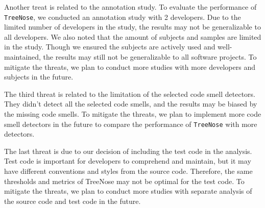 Another treat is related to the annotation study. To evaluate the performance
of \texttt{TreeNose}, we conducted an annotation study with 2 developers. Due
to the limited number of developers in the study, the results may not be
generalizable to all developers. We also noted that the amount of subjects and
samples are limited in the study. Though we ensured the subjects are actively
used and well-maintained, the results may still not be generalizable to all
software projects. To mitigate the threats, we plan to conduct more studies
with more developers and subjects in the future.

The third threat is related to the limitation of the selected code smell
detectors. They didn't detect all the selected code smells, and the results may
be biased by the missing code smells. To mitigate the threats, we plan to
implement more code smell detectors in the future to compare the performance of
\texttt{TreeNose} with more detectors.

The last threat is due to our decision of including the test code in the
analysis. Test code is important for developers to comprehend and maintain, but
it may have different conventions and styles from the source code. Therefore,
the same thresholds and metrics of TreeNose may not be optimal for the test
code. To mitigate the threats, we plan to conduct more studies with separate
analysis of the source code and test code in the future.
